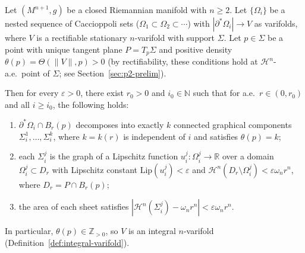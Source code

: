\begin{lemma}\label{lem:sheet-decomposition}
Let $(M^{n+1}, g)$ be a closed Riemannian manifold with $n \geq 2$. Let $\{\Omega_i\}$ be a nested sequence of Caccioppoli sets ($\Omega_1 \subset \Omega_2 \subset \cdots$) with $|\partial^*\Omega_i| \to V$ as varifolds, where $V$ is a rectifiable stationary $n$-varifold with support $\Sigma$. Let $p \in \Sigma$ be a point with unique tangent plane $P = T_p\Sigma$ and positive density $\theta(p) = \Theta(\|V\|, p) > 0$ (by rectifiability, these conditions hold at $\mathcal{H}^n$-a.e.\ point of $\Sigma$; see Section~\ref{sec:p2-prelim}).

Then for every $\varepsilon > 0$, there exist $r_0 > 0$ and $i_0 \in \mathbb{N}$ such that for a.e.\ $r \in (0, r_0)$ and all $i \geq i_0$, the following holds:
\begin{enumerate}[label=\textup{(\roman*)}]
    \item $\partial^*\Omega_i \cap B_r(p)$ decomposes into exactly $k$ connected graphical components $\Sigma_i^1, \ldots, \Sigma_i^k$, where $k = k(r)$ is independent of $i$ and satisfies $\theta(p) = k$;
    \item each $\Sigma_i^j$ is the graph of a Lipschitz function $u_i^j \colon \Omega_i^j \to \mathbb{R}$ over a domain $\Omega_i^j \subset D_r$ with Lipschitz constant $\mathrm{Lip}(u_i^j) < \varepsilon$ and $\mathcal{H}^n(D_r \setminus \Omega_i^j) < \varepsilon \omega_n r^n$, where $D_r = P \cap B_r(p)$;
    \item the area of each sheet satisfies $|\mathcal{H}^n(\Sigma_i^j) - \omega_n r^n| < \varepsilon \omega_n r^n$.
\end{enumerate}
In particular, $\theta(p) \in \mathbb{Z}_{>0}$, so $V$ is an integral $n$-varifold (Definition~\ref{def:integral-varifold}).
\end{lemma}

